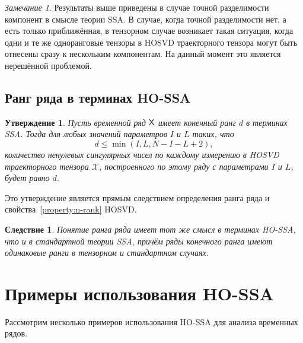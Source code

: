 \documentclass[specialist,
    substylefile = spbu_report.rtx,
    subf,href,colorlinks=true, 12pt]{disser}
\theoremstyle{plain}
\newtheorem{statement}{Утверждение}[section]
\newtheorem{corollary}{Следствие}[statement]
\theoremstyle{definition}
\theoremstyle{remark}
\newtheorem*{remark}{Замечание}
\begin{document}
    \begin{remark}
        Результаты выше приведены в случае точной разделимости компонент в смысле теории SSA\@.
        В случае, когда точной разделимости нет, а есть только приближённая, в тензорном случае возникает такая
        ситуация, когда одни и те же одноранговые тензоры в HOSVD траекторного тензора могут быть отнесены
        сразу к нескольким компонентам.
        На данный момент это является нерешённой проблемой.
    \end{remark}

    \subsection{Ранг ряда в терминах HO-SSA}\label{subsec:tensor-ssa-rank}
    \begin{statement}
        \label{state:tens-ssa-rank}
        Пусть временной ряд $\mathsf{X}$ имеет конечный ранг $d$ в терминах \emph{SSA}\@.
        Тогда для любых значений параметров $I$ и $L$ таких, что
        \[
            d\leqslant\min(I, L, N-I-L+2),
        \]
        количество ненулевых сингулярных чисел по каждому измерению в \emph{HOSVD} траекторного тензора $\mathcal{X}$,
        построенного по этому ряду с параметрами $I$ и $L$, будет равно $d$.
    \end{statement}
    Это утверждение является прямым следствием определения ранга ряда и свойства~\ref{property:n-rank} HOSVD\@.

    \begin{corollary}
        Понятие ранга ряда имеет тот же смысл в терминах HO-SSA, что и в стандартной теории SSA, причём ряды конечного ранга
        имеют одинаковые ранги в тензорном и стандартном случаях.
    \end{corollary}


    \section{Примеры использования HO-SSA}\label{sec:tensor-ssa-examples}
    Рассмотрим несколько примеров использования HO-SSA для анализа временных рядов.
\end{document}
